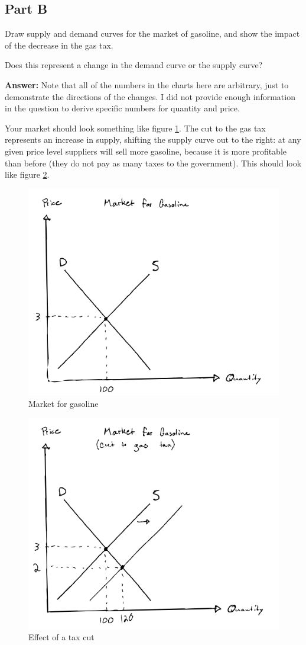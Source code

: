 \documentclass[12pt]{article}
\begin{document}
\subsection*{Part B}
Draw supply and demand curves for the market of gasoline, and show the impact of the decrease in the gas tax.

\medskip

Does this represent a change in the demand curve or the supply curve?

\textbf{Answer:}
Note that all of the numbers in the charts here are arbitrary, just to demonstrate the directions of the changes. I did not provide enough information in the question to derive specific numbers for quantity and price.

\medskip

Your market should look something like figure \ref{fig:market_for_gas}. The cut to the gas tax represents an increase in supply, shifting the supply curve out to the right: at any given price level suppliers will sell more gasoline, because it is more profitable than before (they do not pay as many taxes to the government). This should look like figure \ref{fig:tax_cut}.

\begin{figure}
    \centering
    \includegraphics[width=.6\textwidth]{market_for_gas.png}
    \caption{Market for gasoline}
    \label{fig:market_for_gas}
\end{figure}

\begin{figure}
    \centering
    \includegraphics[width=.6\textwidth]{tax_cut.png}
    \caption{Effect of a tax cut}
    \label{fig:tax_cut}
\end{figure}
\end{document}
